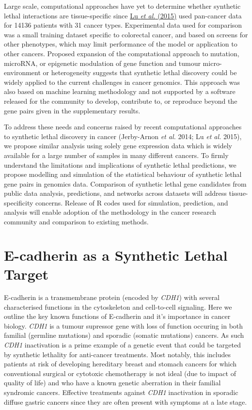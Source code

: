 Large scale, computational approaches have yet to determine whether synthetic lethal interactions are tissue-specific since \hyperlink{ENREF74}{Lu}\hyperlink{ENREF74}{\textit{ et al.}}\hyperlink{ENREF74}{ (2015)} used pan-cancer data for 14136 patients with 31 cancer types. Experimental data used for comparison was a small training dataset specific to colorectal cancer, and based on screens for other phenotypes, which may limit performance of the model or application to other cancers. Proposed expansion of the computational approach to mutation, microRNA, or epigenetic modulation of gene function and tumour micro-environment or heterogeneity suggests that synthetic lethal discovery could be widely applied to the current challenges in cancer genomics. This approach was also based on machine learning methodology and not supported by a software released for the community to develop, contribute to, or reproduce beyond the gene pairs given in the supplementary results. 

To address these needs and concerns raised by recent computational approaches to synthetic lethal discovery in cancer (Jerby-Arnon\textit{ et al.} 2014; Lu\textit{ et al.} 2015), we propose similar analysis using solely gene expression data which is widely available for a large number of samples in many different cancers. To firmly understand the limitations and implications of synthetic lethal predictions, we propose modelling and simulation of the statistical behaviour of synthetic lethal gene pairs in genomics data. Comparison of synthetic lethal gene candidates from public data analysis, predictions, and networks across datasets will address tissue-specificity concerns. Release of R codes used for simulation, prediction, and analysis will enable adoption of the methodology in the cancer research community and comparison to existing methods. 


\section{E-cadherin as a Synthetic Lethal Target}

E-cadherin is a transmembrane protein (encoded by \textit{CDH1}) with several characterised functions in the cytoskeleton and cell-to-cell signaling. Here we outline the key known functions of E-cadherin and it's importance in cancer biology. \textit{CDH1} is a tumour supressor gene with loss of function occuring in both familial (germline mutations) and sporadic (somatic mutations) cancers. As such \textit{CDH1} inactivation is a prime example of a genetic event that could be targeted by synthetic lethality for anti-cancer treatments. Most notably, this includes patients at risk of developing hereditary breast and stomach cancers for which conventional surgical or cytotoxic chemotherapy is not ideal (due to impact of quality of life) and who have a known genetic aberration in their familial syndromic cancers. Effective treatments against \textit{CDH1} inactivation in sporadic diffuse gastric cancers since they are often present with symptoms at a late stage.

